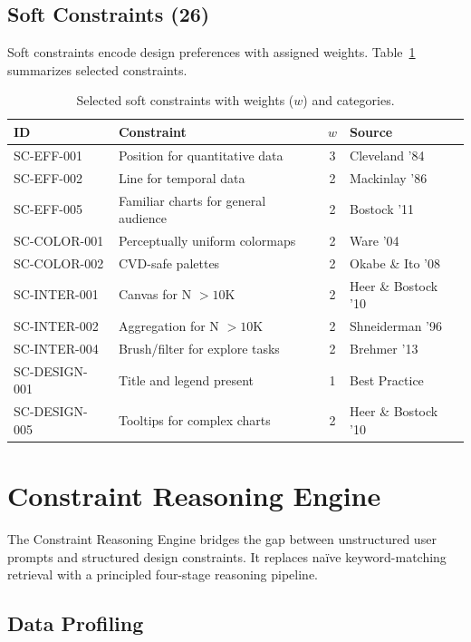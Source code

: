 \documentclass[journal]{vgtc}
\begin{document}
\subsection{Soft Constraints (26)}

Soft constraints encode design preferences with assigned weights.
Table~\ref{tab:soft_constraints} summarizes selected constraints.

\begin{table}[t]
\centering
\caption{Selected soft constraints with weights ($w$) and categories.}
\label{tab:soft_constraints}
\small
\begin{tabular}{llcl}
\toprule
\textbf{ID} & \textbf{Constraint} & $w$ & \textbf{Source} \\
\midrule
SC-EFF-001 & Position for quantitative data & 3 & Cleveland '84 \\
SC-EFF-002 & Line for temporal data & 2 & Mackinlay '86 \\
SC-EFF-005 & Familiar charts for general audience & 2 & Bostock '11 \\
SC-COLOR-001 & Perceptually uniform colormaps & 2 & Ware '04 \\
SC-COLOR-002 & CVD-safe palettes & 2 & Okabe \& Ito '08 \\
SC-INTER-001 & Canvas for N $> 10$K & 2 & Heer \& Bostock '10 \\
SC-INTER-002 & Aggregation for N $> 10$K & 2 & Shneiderman '96 \\
SC-INTER-004 & Brush/filter for explore tasks & 2 & Brehmer '13 \\
SC-DESIGN-001 & Title and legend present & 1 & Best Practice \\
SC-DESIGN-005 & Tooltips for complex charts & 2 & Heer \& Bostock '10 \\
\bottomrule
\end{tabular}
\end{table}

\section{Constraint Reasoning Engine}

The Constraint Reasoning Engine bridges the gap between unstructured user prompts and structured design constraints.
It replaces na\"ive keyword-matching retrieval with a principled four-stage reasoning pipeline.

\subsection{Data Profiling}
\end{document}
